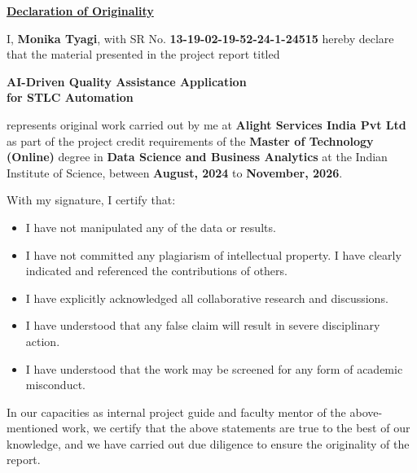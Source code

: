 \documentclass[oneside,12pt]{IIScthesisPSnPDF}
\title{\mytitle}
\author{\myauthor}
\newcommand{\mytitle}{AI-Driven Quality Assistance Application\\for STLC Automation}
\newcommand{\myauthor}{Monika Tyagi}
\newcommand{\mysrno}{13-19-02-19-52-24-1-24515}
\newcommand{\mydegreejoindate}{August, 2024}
\newcommand{\mydegreeenddate}{November, 2026}
\newcommand{\mystream}{Data Science and Business Analytics}
\newcommand{\mycompanyname}{Alight Services India Pvt Ltd}
\newcommand{\blankpage}{
  \newpage
  \thispagestyle{empty}
  \mbox{}
  \newpage
}
\begin{document}
\maketitle
{}
\setcounter{secnumdepth}{3}
\setcounter{tocdepth}{3}

\blankpage
\thispagestyle{empty}
\begingroup{}
\begin{center}
\LARGE{\underline{\textbf{Declaration of Originality}}}
\end{center}
\noindent I, \textbf{\myauthor}, with SR No. \textbf{\mysrno} hereby declare that the material presented in the project report titled

\begin{center}
\textbf{\mytitle}
\end{center}

\noindent represents original work carried out by me at \textbf{\mycompanyname} as part of the project credit requirements of the \textbf{Master of Technology (Online)} degree in \textbf{\mystream} at the Indian Institute of Science, between \textbf{\mydegreejoindate} to \textbf{\mydegreeenddate}.

\noindent With my signature, I certify that:
\begin{itemize}
	\item I have not manipulated any of the data or results.
	\item I have not committed any plagiarism of intellectual property. I have clearly indicated and referenced the contributions of others.
	\item I have explicitly acknowledged all collaborative research and discussions.
	\item I have understood that any false claim will result in severe disciplinary action.
	\item I have understood that the work may be screened for any form of academic misconduct.
\end{itemize}

\vspace{10mm}

 \qquad

\vspace{10mm}

\noindent In our capacities as internal project guide and faculty mentor of the above-mentioned work, we certify that the above statements are true to the best of our knowledge, and we have carried out due diligence to ensure the originality of the report.
\end{document}
